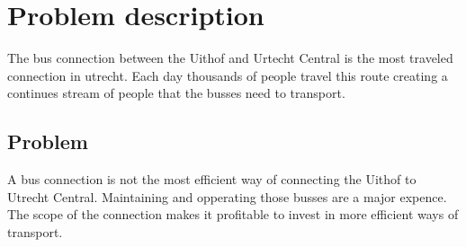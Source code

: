 \section{Problem description}

The bus connection between the Uithof and Urtecht Central is the most traveled 
connection in utrecht. Each day thousands of people travel this route creating 
a continues stream of people that the busses need to transport. 

\subsection{Problem}

A bus connection is not the most efficient way of connecting the Uithof to 
Utrecht Central. Maintaining and opperating those busses are a major expence. 
The scope of the connection makes it profitable to invest in more efficient 
ways of transport.
